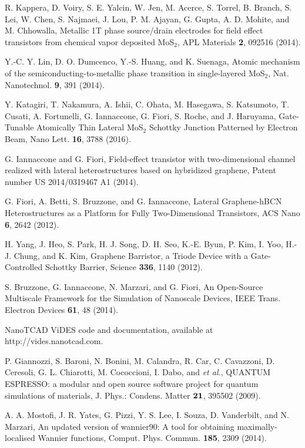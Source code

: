 \documentclass[aps,reprint,superscriptaddress,secnumarabic,amssymb,showpacs]{revtex4-1}
\begin{document}
\begin{thebibliography}{100}
 R. Kappera, D. Voiry, S. E. Yalcin, W. Jen, M. Acerce, S. Torrel, B. Branch, S. Lei, W. Chen, S. Najmaei, J. Lou, P. M. Ajayan, G. Gupta, A. D. Mohite, and M. Chhowalla,
Metallic 1T phase source/drain electrodes for field effect transistors from chemical vapor deposited MoS$_2$,
APL Materials \textbf{2}, 092516 (2014).

  Y.-C. Y. Lin, D. O. Dumcenco, Y.-S. Huang, and K. Suenaga, 
Atomic mechanism of the semiconducting-to-metallic phase transition in single-layered MoS$_2$,
Nat. Nanotechnol. \textbf{9}, 391 (2014).

 Y. Katagiri, T. Nakamura, A. Ishii, C. Ohata, M. Hasegawa, S. Katsumoto, T. Cusati, A. Fortunelli, G. Iannaccone, G. Fiori, S. Roche, and J. Haruyama, 
Gate-Tunable Atomically Thin Lateral MoS$_2$ Schottky Junction Patterned by Electron Beam,
Nano Lett. \textbf{16}, 3788 (2016).

G. Iannaccone and G. Fiori, 
Field-effect transistor with two-dimensional channel realized with lateral heterostructures based on hybridized graphene,
Patent number US 2014/0319467 A1 (2014).

 G. Fiori, A. Betti, S. Bruzzone, and G. Iannaccone, 
Lateral Graphene-hBCN Heterostructures as a Platform for Fully Two-Dimensional Transistors,
ACS Nano \textbf{6}, 2642 (2012).

 H. Yang, J. Heo, S. Park, H. J. Song, D. H. Seo, K.-E. Byun, P. Kim, I. Yoo, H.-J. Chung, and K. Kim,
Graphene Barristor, a Triode Device with a Gate-Controlled Schottky Barrier,
Science \textbf{336}, 1140 (2012).

 S. Bruzzone, G. Iannaccone, N. Marzari, and G. Fiori, 
An Open-Source Multiscale Framework for the Simulation of Nanoscale Devices,
IEEE Trans. Electron Devices \textbf{61}, 48 (2014).

 NanoTCAD ViDES code and documentation, available at http://vides.nanotcad.com.

 P. Giannozzi, S. Baroni, N. Bonini, M. Calandra, R. Car, C. Cavazzoni, D. Ceresoli,  G. L. Chiarotti, M. Cococcioni, I. Dabo, and \emph{et al.}, 
QUANTUM ESPRESSO: a modular and open source software project for quantum simulations of materials,
J. Phys.: Condens. Matter $\bf 21$, 395502 (2009).

 A. A. Mostofi, J. R. Yates, G. Pizzi, Y. S. Lee, I. Souza, D. Vanderbilt, and N. Marzari, 
An updated version of wannier90: A tool for obtaining maximally-localised Wannier functions,
Comput. Phys. Commun. \textbf{185}, 2309 (2014).


\end{thebibliography}
\end{document}
